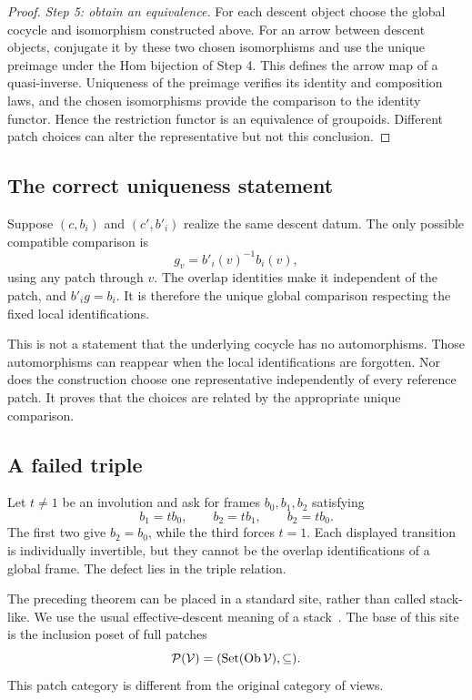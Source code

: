 \begin{proof}
\emph{Step 5: obtain an equivalence.} For each descent object choose the global cocycle and isomorphism constructed above. For an arrow between descent objects, conjugate it by these two chosen isomorphisms and use the unique preimage under the Hom bijection of Step 4. This defines the arrow map of a quasi-inverse. Uniqueness of the preimage verifies its identity and composition laws, and the chosen isomorphisms provide the comparison to the identity functor. Hence the restriction functor is an equivalence of groupoids. Different patch choices can alter the representative but not this conclusion.
\end{proof}

\subsection{The correct uniqueness statement}
Suppose \((c,b_i)\) and \((c',b'_i)\) realize the same descent datum. The only possible compatible comparison is
\[
 g_v=b'_i(v)^{-1}b_i(v),
\]
using any patch through \(v\). The overlap identities make it independent of the patch, and \(b'_ig=b_i\). It is therefore the unique global comparison respecting the fixed local identifications.

This is not a statement that the underlying cocycle has no automorphisms. Those automorphisms can reappear when the local identifications are forgotten. Nor does the construction choose one representative independently of every reference patch. It proves that the choices are related by the appropriate unique comparison.

\subsection{A failed triple}
Let \(t\ne1\) be an involution and ask for frames \(b_0,b_1,b_2\) satisfying
\[
 b_1=tb_0,\qquad b_2=tb_1,\qquad b_2=tb_0.
\]
The first two give \(b_2=b_0\), while the third forces \(t=1\). Each displayed transition is individually invertible, but they cannot be the overlap identifications of a global frame. The defect lies in the triple relation.


\label{sec:stack}
The preceding theorem can be placed in a standard site, rather than called stack-like. We use the usual effective-descent meaning of a stack~\cite{stacks-stack,mathlib-stack}. The base of this site is the inclusion poset of full patches
\[
 \mathcal P(\mathcal V)=(\operatorname{Set}(\operatorname{Ob}\mathcal V),\subseteq).
\]
This patch category is different from the original category of views.

